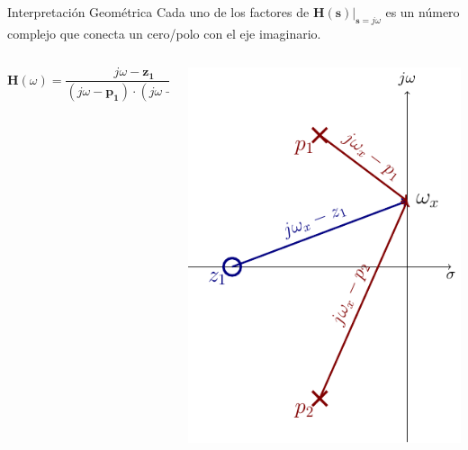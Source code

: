 \documentclass[xcolor={usenames,svgnames,dvipsnames}]{beamer}
\newcommand{\laplace}[1]{\mathbf{#1}(\mathbf{s})}
\newcommand{\slp}{\mathbf{s}}
\newcommand{\fasor}[1]{\mathbf{#1}(\omega)}
\begin{document}
\begin{frame}[label={sec:org8457596}]{Interpretación Geométrica}
Cada uno de los factores de \(\laplace{H}\rvert_{\slp = j\omega}\) es un número complejo que conecta un cero/polo con el eje imaginario.
\begin{columns}
\begin{column}[t]{0.3\columnwidth}
\[
\fasor{H} = \frac{j\omega - \mathbf{z_1}}{(j\omega - \mathbf{p_1}) \cdot (j\omega - \mathbf{p_2})}
\]
\end{column}
\begin{column}[t]{0.7\columnwidth}
\begin{center}
\includegraphics[height=0.8\textheight]{../figs/InterpretacionGeometrica.pdf}
\end{center}
\end{column}
\end{columns}
\end{frame}
\end{document}
